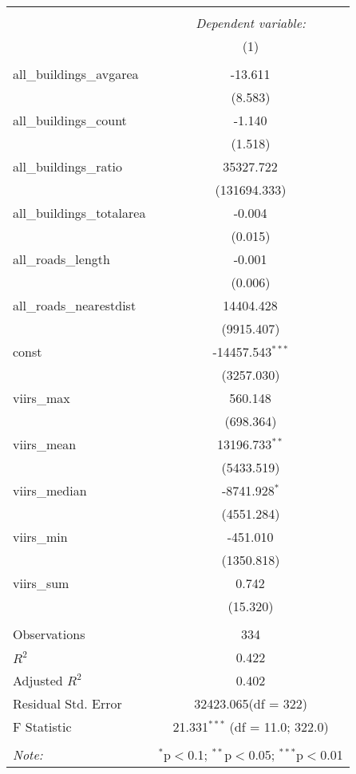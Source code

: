 \begin{table}[!htbp] \centering
\begin{tabular}{@{\extracolsep{5pt}}lc}
\\[-1.8ex]\hline
\hline \\[-1.8ex]
& \multicolumn{1}{c}{\textit{Dependent variable:}} \
\cr \cline{1-2}
\\[-1.8ex] & (1) \\
\hline \\[-1.8ex]
 all_buildings_avgarea & -13.611$^{}$ \\
  & (8.583) \\
 all_buildings_count & -1.140$^{}$ \\
  & (1.518) \\
 all_buildings_ratio & 35327.722$^{}$ \\
  & (131694.333) \\
 all_buildings_totalarea & -0.004$^{}$ \\
  & (0.015) \\
 all_roads_length & -0.001$^{}$ \\
  & (0.006) \\
 all_roads_nearestdist & 14404.428$^{}$ \\
  & (9915.407) \\
 const & -14457.543$^{***}$ \\
  & (3257.030) \\
 viirs_max & 560.148$^{}$ \\
  & (698.364) \\
 viirs_mean & 13196.733$^{**}$ \\
  & (5433.519) \\
 viirs_median & -8741.928$^{*}$ \\
  & (4551.284) \\
 viirs_min & -451.010$^{}$ \\
  & (1350.818) \\
 viirs_sum & 0.742$^{}$ \\
  & (15.320) \\
\hline \\[-1.8ex]
 Observations & 334 \\
 $R^2$ & 0.422 \\
 Adjusted $R^2$ & 0.402 \\
 Residual Std. Error & 32423.065(df = 322)  \\
 F Statistic & 21.331$^{***}$ (df = 11.0; 322.0) \\
\hline
\hline \\[-1.8ex]
\textit{Note:} & \multicolumn{1}{r}{$^{*}$p$<$0.1; $^{**}$p$<$0.05; $^{***}$p$<$0.01} \\
\end{tabular}
\end{table}
